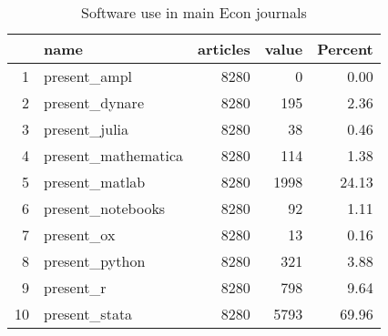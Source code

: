 \begin{table}[ht]
\centering
\caption{Software use in main Econ journals} 
\label{tab:software}
\begin{tabular}{rlrrr}
  \hline
 & name & articles & value & Percent \\ 
  \hline
1 & present\_ampl & 8280 &   0 & 0.00 \\ 
  2 & present\_dynare & 8280 & 195 & 2.36 \\ 
  3 & present\_julia & 8280 &  38 & 0.46 \\ 
  4 & present\_mathematica & 8280 & 114 & 1.38 \\ 
  5 & present\_matlab & 8280 & 1998 & 24.13 \\ 
  6 & present\_notebooks & 8280 &  92 & 1.11 \\ 
  7 & present\_ox & 8280 &  13 & 0.16 \\ 
  8 & present\_python & 8280 & 321 & 3.88 \\ 
  9 & present\_r & 8280 & 798 & 9.64 \\ 
  10 & present\_stata & 8280 & 5793 & 69.96 \\ 
   \hline
\end{tabular}
\end{table}
